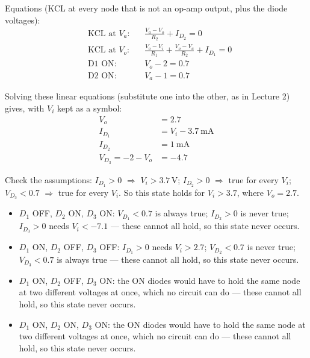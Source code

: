 \documentclass[11pt]{article}
\newcommand{\solstep}[2]{\par\medskip{\color{stepc}\textbf{Step #1 --- #2}}\par\nopagebreak}
\begin{document}
Equations (KCL at every node that is not an op-amp output, plus the diode voltages):\begin{align*}
&\text{KCL at }V_{a}: && \frac{V_{a} - V_{o}}{R_{2}} + I_{D_{2}} = 0 \\
&\text{KCL at }V_{o}: && \frac{V_{o} - V_i}{R_{1}} + \frac{V_{o} - V_{a}}{R_{2}} + I_{D_{1}} = 0 \\
&\text{D1 ON}: && V_{o} - 2 = 0.7 \\
&\text{D2 ON}: && V_{a} - 1 = 0.7
\end{align*}


Solving these linear equations (substitute one into the other, as in Lecture 2) gives, with $V_i$ kept as a symbol:\begin{align*}
V_{o} &= 2.7 \\
I_{D_{1}} &= V_i - 3.7\ \mathrm{mA} \\
I_{D_{2}} &= 1\ \mathrm{mA} \\
V_{D_{3}} = -2 - V_{o} &= -4.7
\end{align*}


Check the assumptions: $I_{D_{1}} > 0$ $\Rightarrow$ $V_i > 3.7$\,V; $I_{D_{2}} > 0$ $\Rightarrow$ true for every $V_i$; $V_{D_{3}} < 0.7$ $\Rightarrow$ true for every $V_i$. So this state holds for $\boxed{V_i > 3.7}$, where $V_o = 2.7$.
\solstep{6}{The other combinations}\begin{itemize}[leftmargin=*,itemsep=2pt]
\item $D_{1}$ OFF, $D_{2}$ ON, $D_{3}$ ON: $V_{D_{1}}<0.7$ is always true; $I_{D_{2}}>0$ is never true; $I_{D_{3}}>0$ needs $V_i < -7.1$ --- these cannot all hold, so this state never occurs.
\item $D_{1}$ ON, $D_{2}$ OFF, $D_{3}$ OFF: $I_{D_{1}}>0$ needs $V_i > 2.7$; $V_{D_{2}}<0.7$ is never true; $V_{D_{3}}<0.7$ is always true --- these cannot all hold, so this state never occurs.
\item $D_{1}$ ON, $D_{2}$ OFF, $D_{3}$ ON: the ON diodes would have to hold the same node at two different voltages at once, which no circuit can do --- these cannot all hold, so this state never occurs.
\item $D_{1}$ ON, $D_{2}$ ON, $D_{3}$ ON: the ON diodes would have to hold the same node at two different voltages at once, which no circuit can do --- these cannot all hold, so this state never occurs.
\end{itemize}
\end{document}
